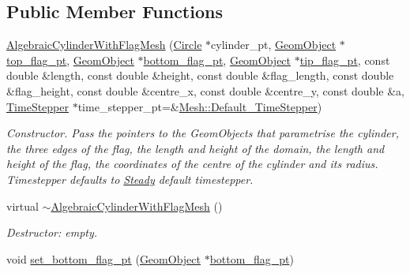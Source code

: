 \subsection*{Public Member Functions}
\begin{DoxyCompactItemize}
\item 
\hyperlink{classoomph_1_1AlgebraicCylinderWithFlagMesh_a2c307b804fee56aa620ea414b41883d5}{Algebraic\+Cylinder\+With\+Flag\+Mesh} (\hyperlink{classoomph_1_1Circle}{Circle} $\ast$cylinder\+\_\+pt, \hyperlink{classoomph_1_1GeomObject}{Geom\+Object} $\ast$\hyperlink{classoomph_1_1AlgebraicCylinderWithFlagMesh_a06bc13adad4aaa037d989bba9e3bf79d}{top\+\_\+flag\+\_\+pt}, \hyperlink{classoomph_1_1GeomObject}{Geom\+Object} $\ast$\hyperlink{classoomph_1_1AlgebraicCylinderWithFlagMesh_a9c362fcc5edeb1b6e773f27a83778495}{bottom\+\_\+flag\+\_\+pt}, \hyperlink{classoomph_1_1GeomObject}{Geom\+Object} $\ast$\hyperlink{classoomph_1_1AlgebraicCylinderWithFlagMesh_ad6d22aaa02d79e3c740b06d98a1597ea}{tip\+\_\+flag\+\_\+pt}, const double \&length, const double \&height, const double \&flag\+\_\+length, const double \&flag\+\_\+height, const double \&centre\+\_\+x, const double \&centre\+\_\+y, const double \&a, \hyperlink{classoomph_1_1TimeStepper}{Time\+Stepper} $\ast$time\+\_\+stepper\+\_\+pt=\&\hyperlink{classoomph_1_1Mesh_a12243d0fee2b1fcee729ee5a4777ea10}{Mesh\+::\+Default\+\_\+\+Time\+Stepper})
\begin{DoxyCompactList}\small\item\em Constructor. Pass the pointers to the Geom\+Objects that parametrise the cylinder, the three edges of the flag, the length and height of the domain, the length and height of the flag, the coordinates of the centre of the cylinder and its radius. Timestepper defaults to \hyperlink{classoomph_1_1Steady}{Steady} default timestepper. \end{DoxyCompactList}\item 
virtual \hyperlink{classoomph_1_1AlgebraicCylinderWithFlagMesh_ac7e92a8dc3add0cd1f666dc8c9f8ca6f}{$\sim$\+Algebraic\+Cylinder\+With\+Flag\+Mesh} ()
\begin{DoxyCompactList}\small\item\em Destructor\+: empty. \end{DoxyCompactList}\item 
void \hyperlink{classoomph_1_1AlgebraicCylinderWithFlagMesh_a6aeef710528a9d8dd51023dd6ee131ea}{set\+\_\+bottom\+\_\+flag\+\_\+pt} (\hyperlink{classoomph_1_1GeomObject}{Geom\+Object} $\ast$\hyperlink{classoomph_1_1AlgebraicCylinderWithFlagMesh_a9c362fcc5edeb1b6e773f27a83778495}{bottom\+\_\+flag\+\_\+pt})

\end{DoxyCompactItemize}
